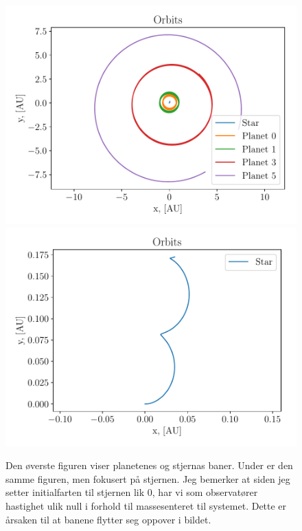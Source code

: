 \documentclass[reprint, english,notitlepage]{revtex4-1}  %
\begin{document}
\begin{figure}
  \includegraphics[width=\linewidth]{../output/plots/orbits.pdf}
  \includegraphics[width=\linewidth]{../output/plots/orbits_star.pdf}
  \caption{Den øverste figuren viser planetenes og stjernas baner. Under er den samme figuren, men fokusert på stjernen. Jeg bemerker at siden jeg setter initialfarten til stjernen lik 0, har vi som observatører hastighet ulik null i forhold til massesenteret til systemet. Dette er årsaken til at banene flytter seg oppover i bildet.}
  \label{fig:orbits}
\end{figure}
\end{document}
